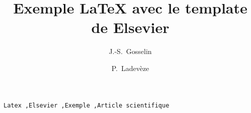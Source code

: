 



\begin{frontmatter} 

\title{Exemple \LaTeX{} avec le template de Elsevier}

\author[inrs]{J.-S.~Gosselin}
\author[inrs,cgc]{P.~Ladevèze}

\address[inrs]{Institut national de la recherche scientifique, Centre Eau Terre Environnement, 490 rue de la Couronne, Quebec City, Quebec, Canada}
\address[cgc]{Geological Survey of Canada, Quebec Division, 490 rue de la Couronne, Quebec City, Quebec, Canada}

\begin{abstract}
    
\end{abstract}

\begin{keyword}
    \texttt{Latex \sep  Elsevier \sep Exemple \sep Article scientifique}
\end{keyword}
  
\end{frontmatter}

\linenumbers


